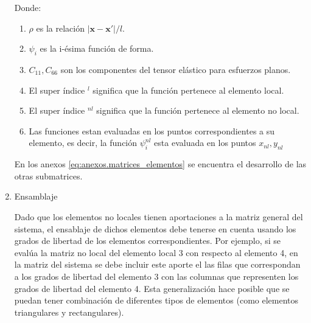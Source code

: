 \begin{enumerate}
				Donde:
				\begin{enumerate}
					\item[] $\rho$ es la relación $|\boldsymbol{x}-\boldsymbol{x'}|/l$.
					\item[] $\psi_i$ es la i-ésima función de forma.
					\item[] $C_{11},C_{66}$ son los componentes del tensor elástico para esfuerzos planos.
					\item[] El super índice $^l$ significa que la función pertenece al elemento local.
					\item[] El super índice $^{nl}$ significa que la función pertenece al elemento no local.
					\item[] Las funciones estan evaluadas en los puntos correspondientes a su elemento, es decir, la función $\psi_i^{nl}$ esta evaluada en los puntos $x_{nl},y_{nl}$
				\end{enumerate}
				En los anexos \ref{eq:anexos.matrices_elementos} se encuentra el desarrollo de las otras submatrices.
				\item Ensamblaje

				Dado que los elementos no locales tienen aportaciones a la matriz general del sistema, el ensablaje de dichos elementos debe tenerse en cuenta usando los grados de libertad de los elementos correspondientes. Por ejemplo, si se evalúa la matriz no local del elemento local 3 con respecto al elemento 4, en la matriz del sistema se debe incluir este aporte el las filas que correspondan a los grados de libertad del elemento 3 con las columnas que representen los grados de libertad del elemento 4. Esta generalización hace posible que se puedan tener combinación de diferentes tipos de elementos (como elementos triangulares y rectangulares).
			\end{enumerate}
